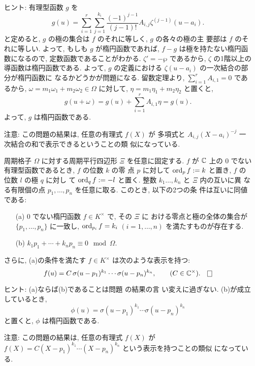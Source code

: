 \documentclass[12pt,twoside]{jarticle}
\def\pe{\wp}
\def\C{{\Bbb C}} %
\def\ord{\mathop{\text{\rm ord}}\nolimits} %
\begin{document}
\noindent ヒント: 有理型函数 $g$ を
\[
  g(u) = 
    \sum_{i=1}^r \sum_{j=1}^{k_i}
    \frac{(-1)^{j-1}}{(j-1)!} A_{i,j} \zeta^{(j-1)}(u-a_i).
\] %
と定めると, $g$ の極の集合は $f$ のそれに等しく, $g$ の各々の極の主
要部は $f$ のそれに等しい. よって, もしも $g$ が楕円函数であれば, %
$f-g$ は極を持たない楕円函数になるので, 定数函数であることがわかる. %
$\zeta'=-\pe$ であるから, $\zeta$ の1階以上の導函数は楕円函数である. 
よって, $g$ の定義における $\zeta(u-a_i)$ の一次結合の部分が楕円函数に
なるかどうかが問題になる. 留数定理より, $\sum_{i=1}^r A_{i,1}=0$
であるから, $\omega=m_1\omega_1+m_2\omega_2\in\Omega$ に対して, %
$\eta=m_1\eta_1+m_2\eta_2$ と置くと, 
\[
  g(u+\omega)
  = g(u) + \sum_{i=1}^r A_{i,1}\eta
  = g(u).
\]
よって, $g$ は楕円函数である.

\noindent 注意: この問題の結果は, 任意の有理式 $f(X)$ が %
多項式と $A_{i,j}(X-a_i)^{-j}$ 一次結合の和で表示できるということの類
似になっている.

\begin{question}\label{q:ell-sigma}\qstar{*}
  周期格子 $\Omega$ に対する周期平行四辺形 $\Xi$ を任意に固定する.  
  $f$ が $\C$ 上の $0$ でない有理型函数であるとき, $f$ の位数 $k$ の零
  点 $p$ に対して $\ord_p f:=k$ と置き, $f$ の位数 $l$ の極 $q$ に対し
  て $\ord_q f:=-l$ と置く. 整数 $k_1\dots,k_n$ と $\Xi$ 内の互いに異
  なる有限個の点 $p_1,\dots,p_n$ を任意に取る. このとき, 以下の2つの条
  件は互いに同値である:
  \begin{enumerate}
  \item[(a)] $0$ でない楕円函数 $f\in K^{\times}$ で, その $\Xi$ に
    おける零点と極の全体の集合が $\{p_1,\dots,p_n\}$ に一致し,
    $\ord_{p_i}f = k_i$ $(i=1,\dots,n)$ を満たすものが存在する. 
  \item[(b)] $k_1 p_1 + \cdots + k_n p_n \equiv 0 \mod \Omega$.
  \end{enumerate}
  さらに, (a)の条件を満たす $f\in K^{\times}$ は次のような表示を持つ:
  \[
    f(u) = C\, \sigma(u-p_1)^{k_1} \cdots \sigma(u-p_n)^{k_n},
    \qquad (C\in\C^{\times}).
    \qed
  \]
\end{question}

\noindent ヒント: (a)ならば(b)であることは問題  の結果の言
い変えに過ぎない. (b)が成立しているとき,
\[
  \phi(u) = \sigma(u-p_1)^{k_1} \cdots \sigma(u-p_n)^{k_n}
\]
と置くと, $\phi$ は楕円函数である. 

\medskip

\noindent 注意: この問題の結果は, 任意の有理式 $f(X)$ が %
$f(X)=C(X-p_1)^{k_1}\cdots(X-p_n)^{k_n}$ という表示を持つことの類似
になっている. 
\end{document}
